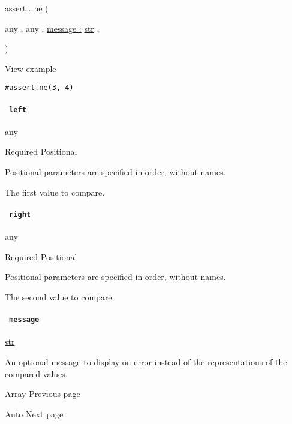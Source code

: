assert { . } { ne } (

{ { any } , } { { any } , } {
\hyperref[definitions-ne-parameters-message]{message :}
\href{/docs/reference/foundations/str/}{str} , }

)


View example

\begin{verbatim}
#assert.ne(3, 4)
\end{verbatim}

\paragraph{\texorpdfstring{\texttt{\ left\ }}{ left }}\label{definitions-ne-left}

{ any }

{Required} {{ Positional }}

\label{definitions-ne-left-positional-tooltip}
Positional parameters are specified in order, without names.

The first value to compare.

\paragraph{\texorpdfstring{\texttt{\ right\ }}{ right }}\label{definitions-ne-right}

{ any }

{Required} {{ Positional }}

\label{definitions-ne-right-positional-tooltip}
Positional parameters are specified in order, without names.

The second value to compare.

\paragraph{\texorpdfstring{\texttt{\ message\ }}{ message }}\label{definitions-ne-message}

\href{/docs/reference/foundations/str/}{str}

An optional message to display on error instead of the representations
of the compared values.

\href{/docs/reference/foundations/array/}{\pandocbounded{}}

{ Array } { Previous page }

\href{/docs/reference/foundations/auto/}{\pandocbounded{}}

{ Auto } { Next page }
